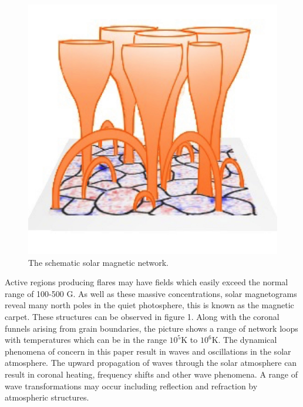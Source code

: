 \documentclass[linenumbers]{aastex63}
\begin{document}




\begin{figure}[h]\label{magneticnetwork}
\centering
\includegraphics[scale=1.0]{solar-network-v1.jpg}
\caption{The schematic solar magnetic network.}
\end{figure}

Active regions producing flares may have fields which easily exceed the normal range of 100-500 G. As well as these massive concentrations, solar magnetograms reveal many north poles in the quiet photosphere, this is known as the magnetic carpet. These structures can be observed in figure 1. Along with the coronal funnels arising from grain boundaries, the picture shows a range of network loops with temperatures which can be in the range $10^{5}$K to $10^{6}$K. The dynamical phenomena of concern in this paper result in waves and oscillations in the solar atmosphere. The upward propagation of waves through the solar atmosphere can result in coronal heating, frequency shifts and other wave phenomena. A range of wave transformations may occur including reflection and refraction by atmospheric structures. 
\end{document}
